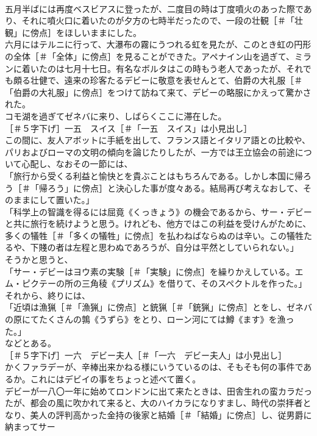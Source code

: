 \documentclass[8pt]{extreport}
\begin{document}
\begin{CJK}{UTF8}{min}
\\	五月半ばには再度ベスビアスに登ったが、二度目の時は丁度噴火のあった際であり、それに噴火口に着いたのが夕方の七時半だったので、一段の壮観［＃「壮観」に傍点］をほしいままにした。
\\	六月にはテルニに行って、大瀑布の霧にうつれる虹を見たが、このとき虹の円形の全体［＃「全体」に傍点］を見ることができた。アペナイン山を過ぎて、ミランに着いたのは七月十七日。有名なボルタはこの時もう老人であったが、それでも頗る壮健で、遠来の珍客たるデビーに敬意を表せんとて、伯爵の大礼服［＃「伯爵の大礼服」に傍点］をつけて訪ねて来て、デビーの略服にかえって驚かされた。
\\	コモ湖を過ぎてゼネバに来り、しばらくここに滞在した。
\\	［＃５字下げ］一五　スイス［＃「一五　スイス」は小見出し］
\\	この間に、友人アボットに手紙を出して、フランス語とイタリア語との比較や、パリおよびローマの文明の傾向を論じたりしたが、一方では王立協会の前途について心配し、なおその一節には、
\\	「旅行から受くる利益と愉快とを貴ぶことはもちろんである。しかし本国に帰ろう［＃「帰ろう」に傍点］と決心した事が度々ある。結局再び考えなおして、そのままにして置いた。」
\\	「科学上の智識を得るには屈竟《くっきょう》の機会であるから、サー・デビーと共に旅行を続けようと思う。けれども、他方ではこの利益を受けんがために、多くの犠牲［＃「多くの犠牲」に傍点］を払わねばならぬのは辛い。この犠牲たるや、下賤の者は左程と思わぬであろうが、自分は平然としていられない。」
\\	そうかと思うと、
\\	「サー・デビーはヨウ素の実験［＃「実験」に傍点］を繰りかえしている。エム・ピクテーの所の三角稜《プリズム》を借りて、そのスペクトルを作った。」
\\	それから、終りには、
\\	「近頃は漁猟［＃「漁猟」に傍点］と銃猟［＃「銃猟」に傍点］とをし、ゼネバの原にてたくさんの鶉《うずら》をとり、ローン河にては鱒《ます》を漁った。」
\\	などとある。
\\	［＃５字下げ］一六　デビー夫人［＃「一六　デビー夫人」は小見出し］
\\	かくファラデーが、辛棒出来かねる様にいうているのは、そもそも何の事件であるか。これにはデビイの事をちょっと述べて置く。
\\	デビーが一八〇一年に始めてロンドンに出て来たときは、田舎生れの蛮カラだったが、都会の風に吹かれて来ると、大のハイカラになりすまし、時代の崇拝者となり、美人の評判高かった金持の後家と結婚［＃「結婚」に傍点］し、従男爵に納まってサー

\end{CJK}
\end{document}
